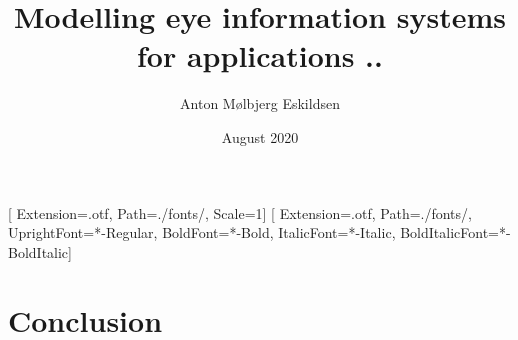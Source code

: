\documentclass[11pt, a4paper, twoside]{report}
\title{Modelling eye information systems for applications ..}
\author{Anton Mølbjerg Eskildsen}
\date{August 2020}
\begin{document}
[
Extension={.otf},
Path=./fonts/,
Scale=1]
\setmainfont{STIX2Text}[
Extension={.otf},
Path=./fonts/,
UprightFont={*-Regular},
BoldFont={*-Bold},
ItalicFont={*-Italic},
BoldItalicFont={*-BoldItalic}]

\maketitle

\tableofcontents















\chapter{Conclusion}

\printbibliography

\newpage

\printnoidxglossaries
\printnomenclature[1in]
\end{document}
